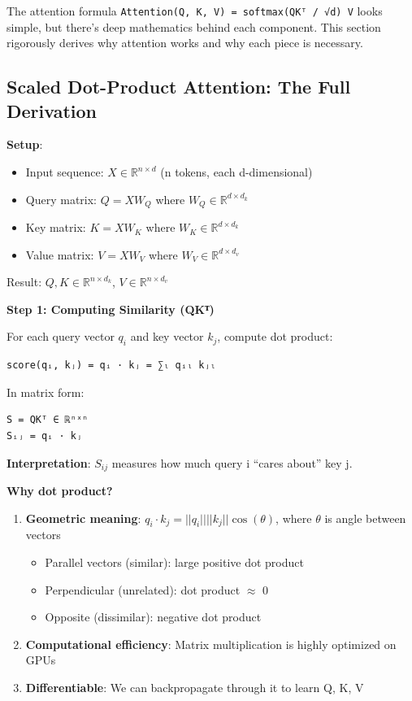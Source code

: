 \documentclass[11pt,oneside]{book}
\begin{document}
The attention formula \texttt{Attention(Q, K, V) = softmax(QKᵀ / √d) V} looks simple, but there's deep mathematics behind each component. This section rigorously derives why attention works and why each piece is necessary.

\subsection{Scaled Dot-Product Attention: The Full Derivation}

\textbf{Setup}:
\begin{itemize}
\item Input sequence: $X \in \mathbb{R}^{n \times d}$ (n tokens, each d-dimensional)
\item Query matrix: $Q = XW_Q$ where $W_Q \in \mathbb{R}^{d \times d_k}$
\item Key matrix: $K = XW_K$ where $W_K \in \mathbb{R}^{d \times d_k}$
\item Value matrix: $V = XW_V$ where $W_V \in \mathbb{R}^{d \times d_v}$
\end{itemize}

Result: $Q, K \in \mathbb{R}^{n \times d_k}$, $V \in \mathbb{R}^{n \times d_v}$

\textbf{Step 1: Computing Similarity (QKᵀ)}

For each query vector $q_i$ and key vector $k_j$, compute dot product:
\begin{verbatim}
score(qᵢ, kⱼ) = qᵢ · kⱼ = ∑ₗ qᵢₗ kⱼₗ
\end{verbatim}

In matrix form:
\begin{verbatim}
S = QKᵀ ∈ ℝⁿˣⁿ
Sᵢⱼ = qᵢ · kⱼ
\end{verbatim}

\textbf{Interpretation}: $S_{ij}$ measures how much query i ``cares about'' key j.

\textbf{Why dot product?}
\begin{enumerate}
\item \textbf{Geometric meaning}: $q_i \cdot k_j = ||q_i|| ||k_j|| \cos(\theta)$, where $\theta$ is angle between vectors
\begin{itemize}
\item Parallel vectors (similar): large positive dot product
\item Perpendicular (unrelated): dot product $\approx$ 0
\item Opposite (dissimilar): negative dot product
\end{itemize}

\item \textbf{Computational efficiency}: Matrix multiplication is highly optimized on GPUs

\item \textbf{Differentiable}: We can backpropagate through it to learn Q, K, V
\end{enumerate}
\end{document}
